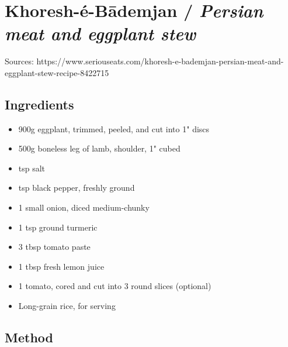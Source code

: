\section{Khoresh-é-Bādemjan / \emph{Persian meat and eggplant stew}}


Sources: https://www.seriouseats.com/khoresh-e-bademjan-persian-meat-and-eggplant-stew-recipe-8422715

\subsection{Ingredients}

\begin{itemize}
    \item 900g eggplant, trimmed, peeled, and cut into 1" discs
    \item 500g boneless leg of lamb, shoulder, 1" cubed
    \item {} tsp salt
    \item {} tsp black pepper, freshly ground
    \item 1 small onion, diced medium-chunky
    \item 1 tsp ground turmeric
    \item 3 tbsp tomato paste
    \item 1 tbsp fresh lemon juice
    \item 1 tomato, cored and cut into 3 round slices (optional)
    \item Long-grain rice, for serving
\end{itemize}

\subsection{Method}

